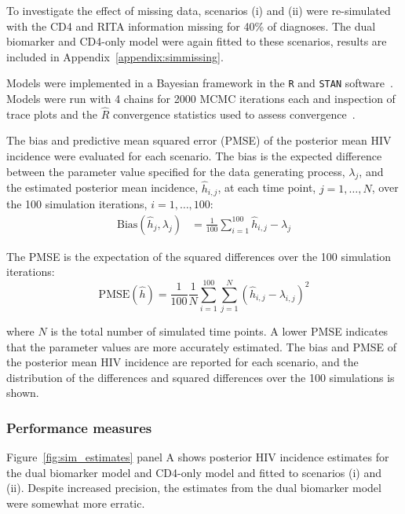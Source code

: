To investigate the effect of missing data, scenarios (i) and (ii) were re-simulated with the CD4 and RITA information missing for 40\% of diagnoses. The dual biomarker and CD4-only model were again fitted to these scenarios, results are included in Appendix~\ref{appendix:simmissing}.

Models were implemented in a Bayesian framework in the \texttt{R} and \texttt{STAN} software~\parencite{R_Core_Team2020-ca, Carpenter2017-wk}. Models were run with 4 chains for 2000 MCMC iterations each and inspection of trace plots and the $\hat{R}$ convergence statistics used to assess convergence~\parencite{Gelman1992-md}.

The bias and predictive mean squared error (PMSE) of the posterior mean HIV incidence were evaluated for each scenario. The bias is the expected difference between the parameter value specified for the data generating process, $\lambda_j$, and the estimated posterior mean incidence, $\hat{h}_{i,j}$, at each time point, $j = 1, \ldots, N$, over the 100 simulation iterations, $i = 1, \ldots, 100$:
%
\begin{align*}
  \text{Bias}(\hat{h}_j, \lambda_j) &= \frac{1}{100} \sum_{i=1}^{100} \hat{h}_{i,j} - \lambda_j
\end{align*}

The PMSE is the expectation of the squared differences over the 100 simulation iterations:
%
\[
  \text{PMSE}(\hat{h}) = \frac{1}{100} \frac{1}{N} \sum_{i=1}^{100} \sum_{j=1}^N{(\hat{h}_{i,j} - \lambda_{i,j})}^2
\]

where $N$ is the total number of simulated time points. A lower PMSE indicates that the parameter values are more accurately estimated. The bias and PMSE of the posterior mean HIV incidence are reported for each scenario, and the distribution of the differences and squared differences over the 100 simulations is shown.

\subsubsection{Performance measures}

Figure~\ref{fig:sim_estimates} panel A shows posterior HIV incidence estimates for the dual biomarker model and CD4-only model and fitted to scenarios (i) and (ii). Despite increased precision, the estimates from the dual biomarker model were somewhat more erratic.

